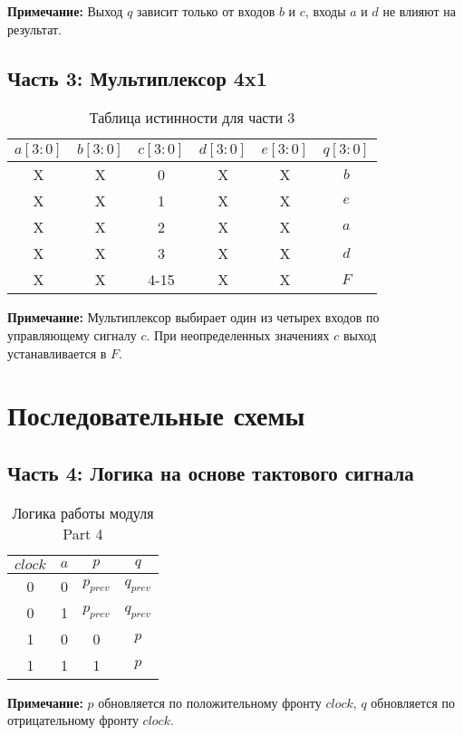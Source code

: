 \documentclass[12pt,a4paper]{article}
\begin{document}
\textbf{Примечание:} Выход $q$ зависит только от входов $b$ и $c$, входы $a$ и $d$ не влияют на результат.

\subsection{Часть 3: Мультиплексор 4x1}

\begin{table}[h]
\centering
\caption{Таблица истинности для части 3}
\begin{tabular}{|c|c|c|c|c|c|}
\hline
$a[3:0]$ & $b[3:0]$ & $c[3:0]$ & $d[3:0]$ & $e[3:0]$ & $q[3:0]$ \\
\hline
X & X & 0 & X & X & $b$ \\
X & X & 1 & X & X & $e$ \\
X & X & 2 & X & X & $a$ \\
X & X & 3 & X & X & $d$ \\
X & X & 4-15 & X & X & $F$ \\
\hline
\end{tabular}
\end{table}

\textbf{Примечание:} Мультиплексор выбирает один из четырех входов по управляющему сигналу $c$. При неопределенных значениях $c$ выход устанавливается в $F$.

\section{Последовательные схемы}

\subsection{Часть 4: Логика на основе тактового сигнала}

\begin{table}[h]
\centering
\caption{Логика работы модуля Part 4}
\begin{tabular}{|c|c|c|c|}
\hline
$clock$ & $a$ & $p$ & $q$ \\
\hline
0 & 0 & $p_{prev}$ & $q_{prev}$ \\
0 & 1 & $p_{prev}$ & $q_{prev}$ \\
1 & 0 & 0 & $p$ \\
1 & 1 & 1 & $p$ \\
\hline
\end{tabular}
\end{table}

\textbf{Примечание:} $p$ обновляется по положительному фронту $clock$, $q$ обновляется по отрицательному фронту $clock$.
\end{document}
